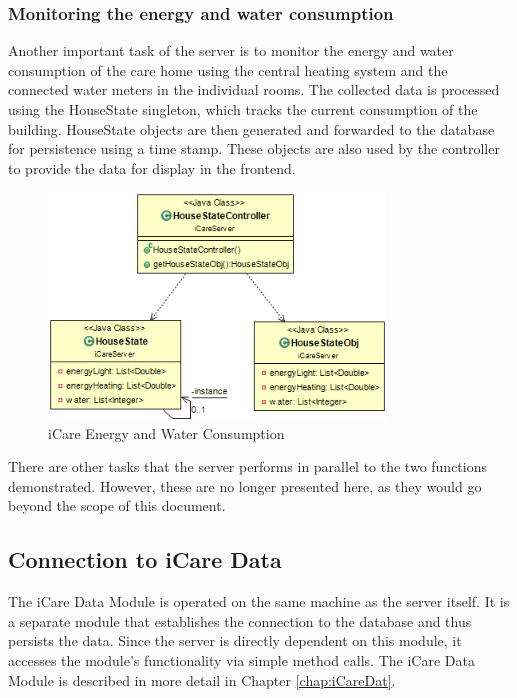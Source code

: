 \subsubsection{Monitoring the energy and water consumption}
Another important task of the server is to monitor the energy and water consumption of the care home using the central heating system and the connected water meters in the individual rooms. The collected data is processed using the HouseState singleton, which tracks the current consumption of the building. HouseState objects are then generated and forwarded to the database for persistence using a time stamp. These objects are also used by the controller to provide the data for display in the frontend.
\begin{figure}[H]
	\centering
	\includegraphics[width =0.8\textwidth]{images/houseState.png}
	\caption{iCare Energy and Water Consumption}
	\label{icare-houseState}
\end{figure}
There are other tasks that the server performs in parallel to the two functions demonstrated. However, these are no longer presented here, as they would go beyond the scope of this document.
\subsection{Connection to iCare Data}
The iCare Data Module is operated on the same machine as the server itself. It is a separate module that establishes the connection to the database and thus persists the data. Since the server is directly dependent on this module, it accesses the module's functionality via simple method calls. The iCare Data Module is described in more detail in Chapter \ref{chap:iCareDat}.